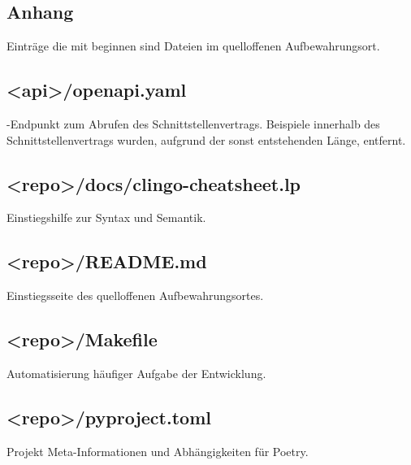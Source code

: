 \appendix

\begin{landscape}
    \chapter{Anhang}\label{ch:anhang}

    Einträge die mit  beginnen sind Dateien im quelloffenen Aufbewahrungsort.

    \section{<api>/openapi.yaml}\label{sec:openapi.yaml}
    -Endpunkt zum Abrufen des Schnittstellenvertrags.
    Beispiele innerhalb des Schnittstellenvertrags wurden, aufgrund der sonst entstehenden Länge, entfernt.
    \vspace{-1em}

    \section{<repo>/docs/clingo-cheatsheet.lp}\label{sec:clingo-cheatsheet.lp}
    Einstiegshilfe zur  Syntax und Semantik.
    \vspace{-1em}

    \section{<repo>/README.md}\label{sec:readme.md}
    Einstiegsseite des quelloffenen Aufbewahrungsortes.
    \vspace{-1em}

    \section{<repo>/Makefile}\label{sec:makefile}
    Automatisierung häufiger Aufgabe der Entwicklung.
    \vspace{-1em}

    \section{<repo>/pyproject.toml}\label{sec:pyproject.toml}
    Projekt Meta-Informationen und Abhängigkeiten für Poetry.
    \vspace{-1em}


\end{landscape}
